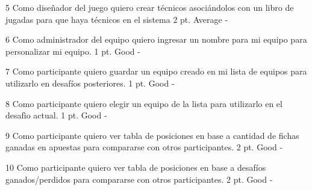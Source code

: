 \vspace{1cm}

\simplestory
{5}
{Como diseñador del juego quiero crear técnicos asociándolos con un libro de jugadas para que haya técnicos en el sistema}
{2 pt.}
{Average}
{-}

\vspace{1cm}

\simplestory
{6}
{Como administrador del equipo quiero ingresar un nombre para mi equipo para personalizar mi equipo.}
{1 pt.}
{Good}
{-}

\vspace{1cm}

\simplestory
{7}
{Como participante quiero guardar un equipo creado en mi lista de equipos para utilizarlo en desafíos posteriores.}
{1 pt.}
{Good}
{-}

\vspace{1cm}

\simplestory
{8}
{Como participante quiero elegir un equipo de la lista para utilizarlo en el desafìo actual.}
{1 pt.}
{Good}
{-}

\vspace{1cm}

\simplestory
{9}
{Como participante quiero ver tabla de posiciones en base a cantidad de fichas ganadas en apuestas para compararse con otros participantes.}
{2 pt.}
{Good}
{-}

\vspace{1cm}

\simplestory
{10}
{Como participante quiero ver tabla de posiciones en base a desafíos ganados/perdidos para compararse con otros participantes.}
{2 pt.}
{Good}
{-}
